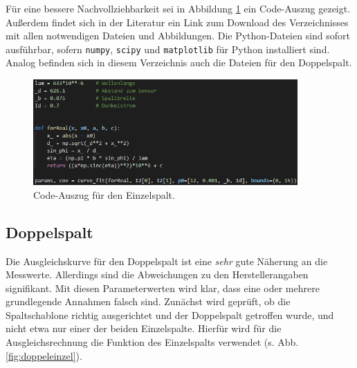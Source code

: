 Für eine bessere Nachvollziehbarkeit sei in Abbildung \ref{fig:screen1} ein Code-Auszug gezeigt. Außerdem findet sich in der Literatur\cite{download} ein Link zum Download des Verzeichnisses mit allen notwendigen Dateien und Abbildungen.
Die Python-Dateien sind sofort ausführbar, sofern \texttt{numpy}, \texttt{scipy} und \texttt{matplotlib} für Python installiert sind. \\
Analog befinden sich in diesem Verzeichnis auch die Dateien für den Doppelspalt.

\begin{figure}
    \centering
    \includegraphics[width=0.9\textwidth]{plots/screen1.png}
    \caption{Code-Auszug für den Einzelspalt.}
    \label{fig:screen1}
\end{figure}

\subsection{Doppelspalt}
Die Ausgleichskurve für den Doppelspalt ist eine \textit{sehr} gute Näherung an die Messwerte. Allerdings sind die Abweichungen zu den Herstellerangaben signifikant.
Mit diesen Parameterwerten wird klar, dass eine oder mehrere grundlegende Annahmen falsch sind. Zunächst wird geprüft, ob die Spaltschablone richtig ausgerichtet und der Doppelspalt getroffen wurde,
und nicht etwa nur einer der beiden Einzelspalte. Hierfür wird für die Ausgleichsrechnung die Funktion des Einzelspalts verwendet (s. Abb. \ref{fig:doppeleinzel}).

